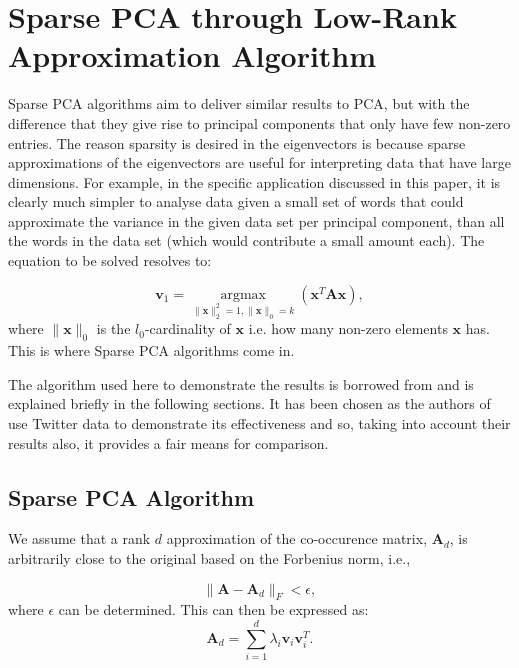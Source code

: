 \documentclass[graybox]{svmult}
\newcommand{\covmat}{\mathbf{A}}
\begin{document}
\section{Sparse PCA through Low-Rank Approximation Algorithm}\label{algorithm}

Sparse PCA algorithms aim to deliver similar results to PCA, but with the difference that they give rise to principal components that only have few non-zero entries. The reason sparsity is desired in the eigenvectors is because sparse approximations of the eigenvectors are useful for interpreting data that have large dimensions. For example, in the specific application discussed in this paper, it is clearly much simpler to analyse data given a small set of words that could approximate the variance in the given data set per principal component, than all the words in the data set (which would contribute a small amount each). The equation to be solved resolves to:

\begin{equation}
\mathbf{v}_1 = \underset{\|\mathbf{x}\|_2^2 = 1, \|\mathbf{x}\|_0 = k}{\operatorname{argmax}}\left( \mathbf{x}^T\mathbf{A}\mathbf{x}\right),
\end{equation}
where $\|\mathbf{x}\|_0$ is the $l_0$-cardinality of $\mathbf{x}$ i.e. how many non-zero elements $\mathbf{x}$ has. This is where Sparse PCA algorithms come in.

The algorithm used here to demonstrate the results is borrowed from \cite{dimakis} and is explained briefly in the following sections. It has been chosen as the authors of \cite{dimakis} use Twitter data to demonstrate its effectiveness and so, taking into account their results also, it provides a fair means for comparison. 

\subsection{Sparse PCA Algorithm}
We assume that a rank $d$ approximation of the co-occurence matrix, $\covmat_d$, is arbitrarily close to the original based on the Forbenius norm, i.e.,

\begin{equation*}
\|\mathbf{A} - \mathbf{A}_d\|_F < \epsilon,
\end{equation*}
where $\epsilon$ can be determined. This can then be expressed as:
\begin{equation*}
\mathbf{A}_d = \sum_{i=1}^d \lambda_i \mathbf{v}_i \mathbf{v}_i^T.
\end{equation*}
\end{document}
